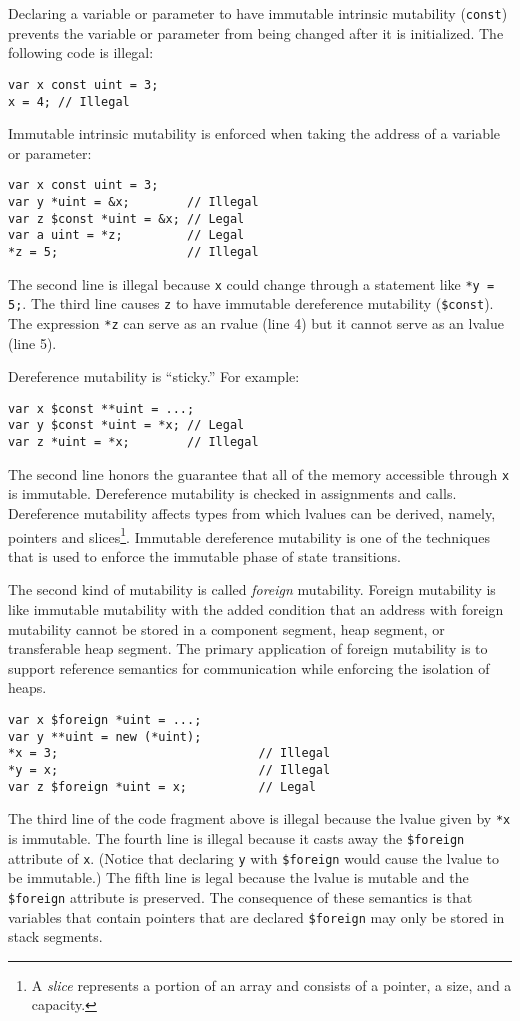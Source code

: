 Declaring a variable or parameter to have immutable intrinsic mutability (\verb+const+) prevents the variable or parameter from being changed after it is initialized.
The following code is illegal:
\begin{verbatim}
var x const uint = 3;
x = 4; // Illegal
\end{verbatim}
Immutable intrinsic mutability is enforced when taking the address of a variable or parameter:
\begin{verbatim}
var x const uint = 3;
var y *uint = &x;        // Illegal
var z $const *uint = &x; // Legal
var a uint = *z;         // Legal
*z = 5;                  // Illegal
\end{verbatim}
The second line is illegal because \verb+x+ could change through a statement like \verb+*y = 5;+.
The third line causes \verb+z+ to have immutable dereference mutability (\verb|$const|).
The expression \verb+*z+ can serve as an rvalue (line 4) but it cannot serve as an lvalue (line 5).

Dereference mutability is ``sticky.''
For example:
\begin{verbatim}
var x $const **uint = ...;
var y $const *uint = *x; // Legal
var z *uint = *x;        // Illegal
\end{verbatim}
The second line honors the guarantee that all of the memory accessible through \verb+x+ is immutable.
Dereference mutability is checked in assignments and calls.
Dereference mutability affects types from which lvalues can be derived, namely, pointers and slices\footnote{A \emph{slice} represents a portion of an array and consists of a pointer, a size, and a capacity.}.
Immutable dereference mutability is one of the techniques that is used to enforce the immutable phase of state transitions.

The second kind of mutability is called \emph{foreign} mutability.
Foreign mutability is like immutable mutability with the added condition that an address with foreign mutability cannot be stored in a component segment, heap segment, or transferable heap segment.
The primary application of foreign mutability is to support reference semantics for communication while enforcing the isolation of heaps.
\begin{verbatim}
var x $foreign *uint = ...;
var y **uint = new (*uint);
*x = 3;                            // Illegal
*y = x;                            // Illegal
var z $foreign *uint = x;          // Legal
\end{verbatim}
The third line of the code fragment above is illegal because the lvalue given by \verb+*x+ is immutable.
The fourth line is illegal because it casts away the \verb|$foreign| attribute of \verb+x+.
(Notice that declaring \verb+y+ with \verb|$foreign| would cause the lvalue to be immutable.)
The fifth line is legal because the lvalue is mutable and the \verb|$foreign| attribute is preserved.
The consequence of these semantics is that variables that contain pointers that are declared \verb|$foreign| may only be stored in stack segments.

